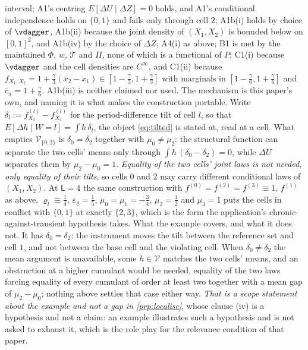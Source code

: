 interval; A1's centring $E[\Delta U\mid\Delta Z]=0$ holds, and A1's conditional independence holds on
$\{0,1\}$ and fails only through cell $2$; A1b(i) holds by choice of $\vdagger$, A1b(ii) because the
joint density of $(X_1,X_2)$ is bounded below on $[0,1]^{2}$, and A1b(iv) by the choice of $\Delta Z$;
A4(i) as above; B1 is met by the maintained $\Phi$, $w$, $\mathcal T$ and $\Pi$, none of which is a
functional of $P$; C1(i) because $\vdagger$ and the cell densities are $C^{\infty}$, and C1(ii) because
$f_{X_1,X_2}=1+\tfrac{\gamma}{3}(x_2-x_1)\in[1-\tfrac{\gamma}{3},1+\tfrac{\gamma}{3}]$ with marginals in
$[1-\tfrac{\gamma}{6},1+\tfrac{\gamma}{6}]$ and $\bar c_\pi=1+\tfrac{\gamma}{6}$. A1b(iii) is
neither claimed nor used.
The mechanism is this paper's own, and naming it is what makes the construction portable. Write
$\delta_l:=f^{(l)}_{X_2}-f^{(l)}_{X_1}$ for the period-difference tilt of cell $l$, so that
$E[\Delta h\mid W=l]=\int h\,\delta_l$, the object \eqref{eq:tilted} is stated at, read at a cell. What
empties $\mathcal V_{\{0,2\}}$ is $\delta_0=\delta_2$ together with $\mu_0\neq\mu_2$: the structural
function can separate the two cells' means only through $\int h\,(\delta_0-\delta_2)=0$, while
$\Delta U$ separates them by $\mu_2-\mu_0=1$. \emph{Equality of the two cells' joint laws is not needed,
only equality of their tilts}, so cells $0$ and $2$ may carry different conditional laws of $(X_1,X_2)$.
At $\mathsf L=4$ the same construction with $f^{(0)}=f^{(2)}=f^{(3)}\equiv1$, $f^{(1)}$ as above,
$\varrho_l\equiv\tfrac14$, $\varepsilon_\varrho=\tfrac15$, $\mu_0=\mu_1=-\tfrac34$, $\mu_2=\tfrac12$ and
$\mu_3=1$ puts the cells in conflict with $\{0,1\}$ at exactly $\{2,3\}$, which is the form the
application's chronic-against-transient hypothesis takes.
What the example covers, and what it does not. It has $\delta_0=\delta_2$: the instrument moves
the tilt between the reference set and cell $1$, and not between the base cell and the violating cell.
When $\delta_0\neq\delta_2$ the mean argument is unavailable, some $h\in\mathcal V$ matches the two
cells' means, and an obstruction at a higher cumulant would be needed, equality of the two laws
forcing equality of every cumulant of order at least two together with a mean gap of $\mu_2-\mu_0$;
nothing above settles that case either way. \emph{That is a scope statement about the example and not a
gap in \cref{prp:localise}}, whose clause \textup{(iv)} is a hypothesis and not a claim: an example
illustrates such a hypothesis and is not asked to exhaust it, which is the role
\citet[Examples~1 and~2]{centorrinofeveflorens2019} play for the relevance condition of that paper.

